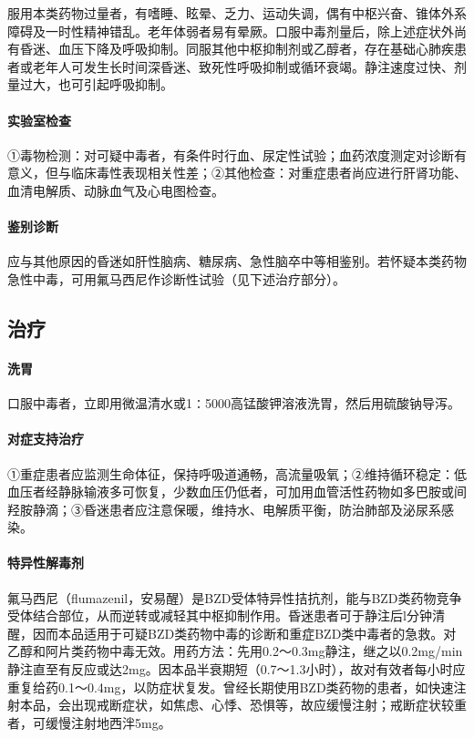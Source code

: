 服用本类药物过量者，有嗜睡、眩晕、乏力、运动失调，偶有中枢兴奋、锥体外系障碍及一时性精神错乱。老年体弱者易有晕厥。口服中毒剂量后，除上述症状外尚有昏迷、血压下降及呼吸抑制。同服其他中枢抑制剂或乙醇者，存在基础心肺疾患者或老年人可发生长时间深昏迷、致死性呼吸抑制或循环衰竭。静注速度过快、剂量过大，也可引起呼吸抑制。

\paragraph{实验室检查}

①毒物检测：对可疑中毒者，有条件时行血、尿定性试验；血药浓度测定对诊断有意义，但与临床毒性表现相关性差；②其他检查：对重症患者尚应进行肝肾功能、血清电解质、动脉血气及心电图检查。

\paragraph{鉴别诊断}

应与其他原因的昏迷如肝性脑病、糖尿病、急性脑卒中等相鉴别。若怀疑本类药物急性中毒，可用氟马西尼作诊断性试验（见下述治疗部分）。

\subsection{治疗}

\paragraph{洗胃}

口服中毒者，立即用微温清水或1∶5000高锰酸钾溶液洗胃，然后用硫酸钠导泻。

\paragraph{对症支持治疗}

①重症患者应监测生命体征，保持呼吸道通畅，高流量吸氧；②维持循环稳定：低血压者经静脉输液多可恢复，少数血压仍低者，可加用血管活性药物如多巴胺或间羟胺静滴；③昏迷患者应注意保暖，维持水、电解质平衡，防治肺部及泌尿系感染。

\paragraph{特异性解毒剂}

氟马西尼（flumazenil，安易醒）是BZD受体特异性拮抗剂，能与BZD类药物竞争受体结合部位，从而逆转或减轻其中枢抑制作用。昏迷患者可于静注后l分钟清醒，因而本品适用于可疑BZD类药物中毒的诊断和重症BZD类中毒者的急救。对乙醇和阿片类药物中毒无效。用药方法：先用0.2～0.3mg静注，继之以0.2mg/min静注直至有反应或达2mg。因本品半衰期短（0.7～1.3小时），故对有效者每小时应重复给药0.1～0.4mg，以防症状复发。曾经长期使用BZD类药物的患者，如快速注射本品，会出现戒断症状，如焦虑、心悸、恐惧等，故应缓慢注射；戒断症状较重者，可缓慢注射地西泮5mg。

